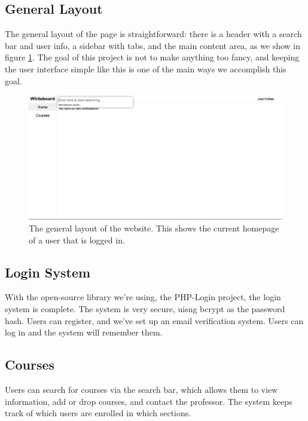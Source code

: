 \documentclass{article}
\begin{document}
\subsection{General Layout}

The general layout of the page is straightforward: there is a header with a
search bar and user info, a sidebar with tabs, and the main content area, as we
show in figure \ref{fig:gl}. The goal of this project is not to make anything
too fancy, and keeping the user interface simple like this is one of the main
ways we accomplish this goal.

\begin{figure}
    \includegraphics[width=\linewidth]{general_layout}
    \caption{The general layout of the website. This shows the current homepage
    of a user that is logged in.}
    \label{fig:gl}
\end{figure}

\subsection{Login System}

With the open-source library we're using, the PHP-Login project, the login
system is complete. The system is very secure, uisng bcrypt as the password
hash. Users can register, and we've set up an email verification system. Users
can log in and the system will remember them.

\subsection{Courses}

Users can search for courses via the search bar, which allows them to view
information, add or drop courses, and contact the professor. The system keeps
track of which users are enrolled in which sections.
\end{document}
